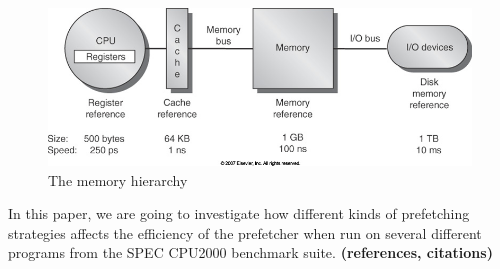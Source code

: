 \begin{figure}[H]
	\centering
	\includegraphics[scale=0.3]{./img/mem_hier}
	\caption{The memory hierarchy}
	\label{img:mem_hier}
\end{figure}

In this paper, we are going to investigate how different kinds of
prefetching strategies affects the efficiency of the prefetcher when
run on several different programs from the SPEC CPU2000 benchmark
suite.  {\bf (references, citations)}
